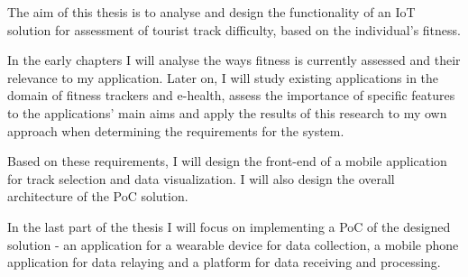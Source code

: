 The aim of this thesis is to analyse and design the functionality of an IoT solution for assessment of tourist track difficulty, based on the individual's fitness.

In the early chapters I will analyse the ways fitness is currently assessed and their relevance to my application.
Later on, I will study existing applications in the domain of fitness trackers and e-health, assess the importance of specific features to the applications' main aims
and apply the results of this research to my own approach when determining the requirements for the system.

Based on these requirements, I will design the front-end of a mobile application for track selection and data visualization.
I will also design the overall architecture of the PoC solution.

In the last part of the thesis I will focus on implementing a PoC of the designed solution - an application for a wearable device for data collection, a mobile phone application for data relaying and a platform for data receiving and processing.

